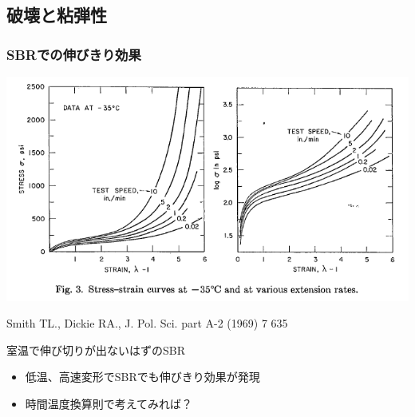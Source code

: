 \documentclass[12pt, dvipdfmx]{beamer}
\begin{document}
\subsection{破壊と粘弾性}

\begin{frame}
	\frametitle{SBRでの伸びきり効果}
		\includegraphics[width=.8\textwidth]{SBR_lowTemp_2.png}

		{\footnotesize Smith TL., Dickie RA., J. Pol. Sci. part A-2 (1969) 7 635}
		\begin{alertblock}{室温で伸び切りが出ないはずのSBR}
			\begin{itemize}
				\item 低温、高速変形でSBRでも伸びきり効果が発現
				\item 時間温度換算則で考えてみれば？
			\end{itemize}
		\end{alertblock}
\end{frame}
\end{document}

